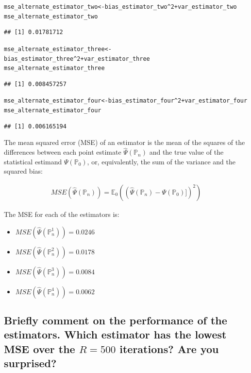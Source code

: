 \documentclass{article}\usepackage[]{graphicx}\usepackage[]{xcolor}
\makeatletter
\newcommand{\hlnum}[1]{\textcolor[rgb]{0.686,0.059,0.569}{#1}}%
\newcommand{\hlopt}[1]{\textcolor[rgb]{0,0,0}{#1}}%
\newcommand{\hlstd}[1]{\textcolor[rgb]{0.345,0.345,0.345}{#1}}%
\newcommand{\hlkwb}[1]{\textcolor[rgb]{0.69,0.353,0.396}{#1}}%
\newenvironment{kframe}{%
 \def\at@end@of@kframe{}%
 \ifinner\ifhmode%
  \def\at@end@of@kframe{\end{minipage}}%
  \begin{minipage}{\columnwidth}%
 \fi\fi%
 \def\FrameCommand##1{\hskip\@totalleftmargin \hskip-\fboxsep
 \colorbox{shadecolor}{##1}\hskip-\fboxsep
     \hskip-\linewidth \hskip-\@totalleftmargin \hskip\columnwidth}%
 \MakeFramed {\advance\hsize-\width
   \@totalleftmargin\z@ \linewidth\hsize
   \@setminipage}}%
 {\par\unskip\endMakeFramed%
 \at@end@of@kframe}
\newenvironment{knitrout}{}{} %
\makeatother
\begin{document}
\begin{knitrout}
\begin{kframe}
\begin{alltt}
\hlstd{mse_alternate_estimator_two} \hlkwb{<-} \hlstd{bias_estimator_two}\hlopt{^}\hlnum{2} \hlopt{+} \hlstd{var_estimator_two}
\hlstd{mse_alternate_estimator_two}
\end{alltt}
\begin{verbatim}
## [1] 0.01781712
\end{verbatim}
\begin{alltt}
\hlstd{mse_alternate_estimator_three} \hlkwb{<-} \hlstd{bias_estimator_three}\hlopt{^}\hlnum{2} \hlopt{+} \hlstd{var_estimator_three}
\hlstd{mse_alternate_estimator_three}
\end{alltt}
\begin{verbatim}
## [1] 0.008457257
\end{verbatim}
\begin{alltt}
\hlstd{mse_alternate_estimator_four} \hlkwb{<-} \hlstd{bias_estimator_four}\hlopt{^}\hlnum{2} \hlopt{+} \hlstd{var_estimator_four}
\hlstd{mse_alternate_estimator_four}
\end{alltt}
\begin{verbatim}
## [1] 0.006165194
\end{verbatim}
\end{kframe}
\end{knitrout}

The mean squared error (MSE) of an estimator is the mean of the squares of the differences between each point estimate $\hat{\Psi}(\mathbb{P}_n)$ and the true value of the statistical estimand $\Psi(\mathbb{P}_0)$, or, equivalently, the sum of the variance and the squared bias:

\begin{align*}
MSE(\hat{\Psi}(\mathbb{P}_n))=\mathbb{E}_0((\hat{\Psi}(\mathbb{P}_n)-\Psi(\mathbb{P}_0)])^2)
\end{align*}

The MSE for each of the estimators is:

\begin{itemize}

  \item $MSE(\hat{\Psi}(\mathbb{P}_n^1))=0.0246$
  \item $MSE(\hat{\Psi}(\mathbb{P}_n^2))=0.0178$
  \item $MSE(\hat{\Psi}(\mathbb{P}_n^3))=0.0084$
  \item $MSE(\hat{\Psi}(\mathbb{P}_n^4))=0.0062$

\end{itemize}

  \subsection{Briefly comment on the performance of the estimators. Which estimator has the lowest MSE over the $R=500$ iterations? Are you surprised?}
  
\end{document}
